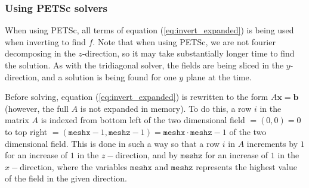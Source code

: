 \documentclass[12pt]{article}
\newcommand{\ve}[1]{\ensuremath{\boldsymbol{#1}}}
\begin{document}
\subsubsection{Using PETSc solvers}
%
When using PETSc, all terms of equation (\ref{eq:invert_expanded}) is being
used when inverting to find $f$. Note that when using PETSc, we are not fourier
decomposing in the $z$-direction, so it may take substantially longer time to
find the solution.  As with the tridiagonal solver, the fields are being sliced
in the $y$-direction, and a solution is being found for one $y$ plane at the
time.

Before solving, equation (\ref{eq:invert_expanded}) is rewritten to the form
$A\ve{x} =\ve{b}$ (however, the full $A$ is not expanded in memory). To do
this, a row $i$ in the matrix $A$ is indexed from bottom left of the two
dimensional field $= (0,0) = 0$ to top right $= (\texttt{meshx}-1,
\texttt{meshz}-1) = \texttt{meshx}\cdot\texttt{meshz}-1$ of the two dimensional
field. This is done in such a way so that a row $i$ in $A$ increments by $1$
for an increase of $1$ in the $z-$direction, and by $\texttt{meshz}$ for an
increase of $1$ in the $x-$direction, where the variables $\texttt{meshx}$ and
$\texttt{meshz}$ represents the highest value of the field in the given
direction.
\end{document}
